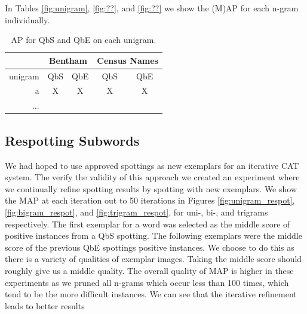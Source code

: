 \documentclass[ms,electronic,twosidetoc,letterpaper,chaptercenter,parttop,lol,lof,lot]{byumsphd}
\begin{document}
In Tables \ref{fig:unigram}, \ref{fig:??}, and \ref{fig:??} we show the (M)AP for each n-gram individually. 
\begin{table}
\centering
\begin{tabular}{| r | c c | c c |}
  \hline
  & \multicolumn{2}{c|}{Bentham} & \multicolumn{2}{c|}{Census Names}\\
  \hline
  unigram & QbS & QbE & QbS & QbE\\
  \hline 
  a & X & X  &   X & X\\
  ...\\
  \hline 
\end{tabular}
\caption{AP for QbS and QbE on each unigram.}
\label{tab:unigram}
\end{table}


\subsection{Respotting Subwords}

We had hoped to use approved spottings as new exemplars for an iterative CAT system. The verify the validity of this approach we created an experiment where we continually refine spotting results by spotting with new exemplars. We show the MAP at each iteration out to 50 iterations in Figures \ref{fig:unigram_respot}, \ref{fig:bigram_respot}, and \ref{fig:trigram_respot}, for uni-, bi-, and trigrams respectively. The first exemplar for a word was selected as the middle score of positive instances from a QbS spotting. The following exemplars were the middle score of the previous QbE spottings positive instances. We choose to do this as there is a variety of qualities of exemplar images. Taking the middle score should roughly give us a middle quality. The overall quality of MAP is higher in these experiments as we pruned all n-grams which occur less than 100 times, which tend to be the more difficult instances.
We can see that the iterative refinement leads to better results
\end{document}
